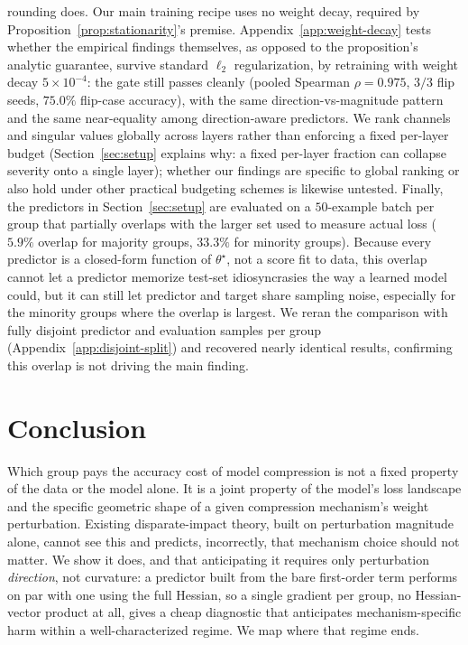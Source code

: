 \documentclass{article}
\newcommand{\theorig}{\theta^\star}
\begin{document}
rounding does. Our main training recipe uses no weight decay, required by Proposition~\ref{prop:stationarity}'s premise. Appendix~\ref{app:weight-decay} tests whether the empirical findings themselves, as opposed to the proposition's analytic guarantee, survive standard $\ell_2$ regularization, by retraining with weight decay $5\times10^{-4}$: the gate still passes cleanly (pooled Spearman $\rho=0.975$, $3/3$ flip seeds, $75.0\%$ flip-case accuracy), with the same direction-vs-magnitude pattern and the same near-equality among direction-aware predictors. We rank channels and singular values globally across layers rather than enforcing a fixed per-layer budget (Section~\ref{sec:setup} explains why: a fixed per-layer fraction can collapse severity onto a single layer); whether our findings are specific to global ranking or also hold under other practical budgeting schemes is likewise untested. Finally, the predictors in Section~\ref{sec:setup} are evaluated on a $50$-example batch per group that partially overlaps with the larger set used to measure actual loss ($5.9\%$ overlap for majority groups, $33.3\%$ for minority groups). Because every predictor is a closed-form function of $\theorig$, not a score fit to data, this overlap cannot let a predictor memorize test-set idiosyncrasies the way a learned model could, but it can still let predictor and target share sampling noise, especially for the minority groups where the overlap is largest. We reran the comparison with fully disjoint predictor and evaluation samples per group (Appendix~\ref{app:disjoint-split}) and recovered nearly identical results, confirming this overlap is not driving the main finding.

\section{Conclusion}
\label{sec:conclusion}

Which group pays the accuracy cost of model compression is not a fixed property of the data or the model alone. It is a joint property of the model's loss landscape and the specific geometric shape of a given compression mechanism's weight perturbation. Existing disparate-impact theory, built on perturbation magnitude alone, cannot see this and predicts, incorrectly, that mechanism choice should not matter. We show it does, and that anticipating it requires only perturbation \emph{direction}, not curvature: a predictor built from the bare first-order term performs on par with one using the full Hessian, so a single gradient per group, no Hessian-vector product at all, gives a cheap diagnostic that anticipates mechanism-specific harm within a well-characterized regime. We map where that regime ends.
\end{document}
